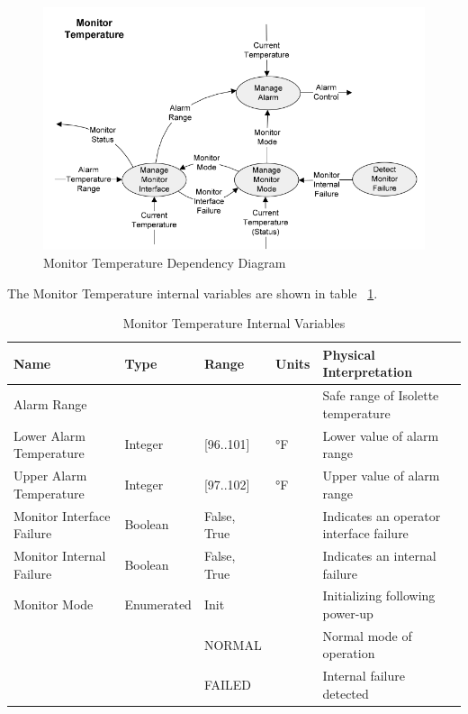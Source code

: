 \begin{figure}[ht]
  \centerline{\includegraphics[width=\textwidth]{figures/monitor-temperature-dependency.png}}
  \vspace{-.4cm}
  \caption{Monitor Temperature Dependency Diagram}
  \vspace{-.4cm}
 \label{fig:monitor-temp-dependency}
\end{figure}

The Monitor Temperature internal variables are shown in table ~\ref{tab:MTI-variables}.

\begin{table}
\begin{tabular}{|l|l|l|l|l|}
\hline
Name & Type & Range & Units & Physical Interpretation \\\hline
Alarm Range &  &  &  & Safe range of Isolette temperature \\\hline
Lower Alarm Temperature & Integer & [96..101] & °F & Lower value of alarm range \\\hline
Upper Alarm Temperature & Integer & [97..102] & °F & Upper value of alarm range \\\hline
Monitor Interface Failure & Boolean & False, True &  & Indicates an operator interface failure \\\hline
Monitor Internal Failure & Boolean & False, True &  & Indicates an internal failure \\\hline
Monitor Mode & Enumerated & Init &  & Initializing following power-up \\\cline{3-5}
  &  & NORMAL &  & Normal mode of operation \\\cline{3-5}
  &  & FAILED &  & Internal failure detected \\\hline
\end{tabular}
\caption{Monitor Temperature Internal Variables}
\label{tab:MTI-variables}
\end{table}

